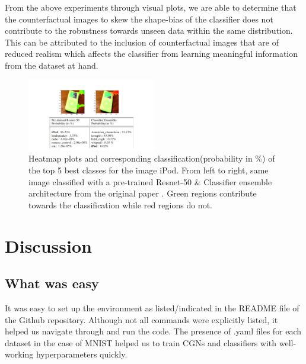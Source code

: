 From the above experiments through visual plots, we are able to determine that the counterfactual images to skew the shape-bias of the classifier does not contribute to the robustness towards unseen data within the same distribution. This can be attributed to the inclusion of counterfactual images that are of reduced realism which affects the classifier from learning meaningful information from the dataset at hand.


\begin{figure}[ht!]
\vspace{-4mm}
\centering
    \includegraphics[width=0.5\textwidth]{../openreview/limeplots/ipod_lime_plot.png}
    \caption{Heatmap plots and corresponding classification(probability in \%) of the top 5 best classes for the image iPod. From left to right, same image classified with a pre-trained Resnet-50 \& Classifier ensemble architecture from the original paper \cite{sauer2021counterfactual}. Green regions contribute towards the classification while red regions do not.
    }
    \label{fig:lime_plot}
\end{figure}

\section{Discussion}
\subsection{What was easy}
It was easy to set up the environment as listed/indicated in the README file of the Github repository. Although not all commands were explicitly listed, it helped us navigate through and run the code. The presence of .yaml files for each dataset in the case of MNIST \cite{lecun1998gradient} helped us to train CGNs and classifiers with well-working hyperparameters quickly. 

